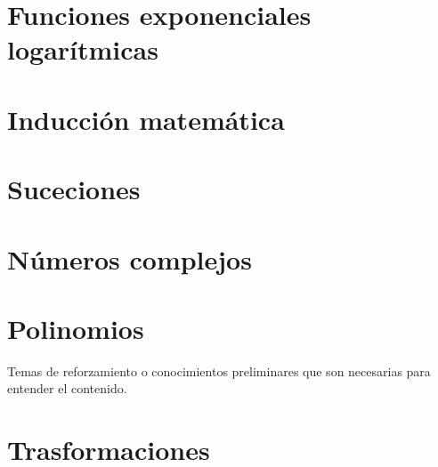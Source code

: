 \documentclass[16pt,]{krantz}
\theoremstyle{definition}
\theoremstyle{definition}
\theoremstyle{definition}
\theoremstyle{definition}
\theoremstyle{remark}
\begin{document}
\hypertarget{funciones-exponenciales-logaruxedtmicas}{%
\chapter{Funciones exponenciales logarítmicas}\label{funciones-exponenciales-logaruxedtmicas}}

\hypertarget{inducciuxf3n-matemuxe1tica}{%
\chapter{Inducción matemática}\label{inducciuxf3n-matemuxe1tica}}

\hypertarget{suceciones}{%
\chapter{Suceciones}\label{suceciones}}

\hypertarget{nuxfameros-complejos}{%
\chapter{Números complejos}\label{nuxfameros-complejos}}

\hypertarget{polinomios}{%
\chapter{Polinomios}\label{polinomios}}

\hypertarget{appendix-apendice}{%
\appendix {}}


Temas de reforzamiento o conocimientos preliminares que son necesarias para entender el contenido.

\hypertarget{trasformaciones}{%
\chapter{Trasformaciones}\label{trasformaciones}}



\printindex
\end{document}
